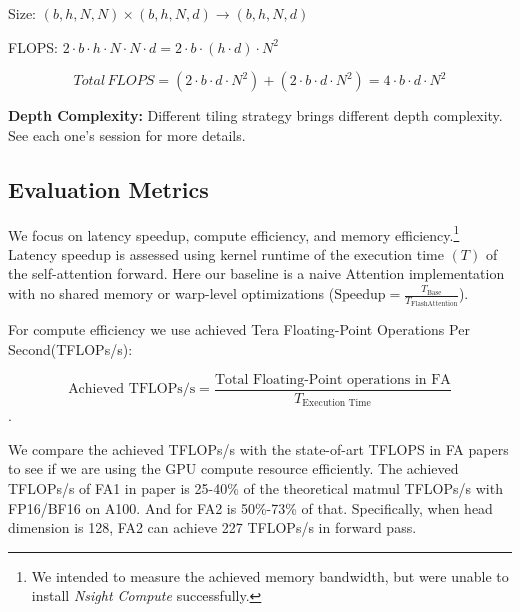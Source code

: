 \documentclass[11pt]{article}
\renewcommand\cite{\citep}  %
\begin{document}
Size: $(b, h, N, N) \times (b, h, N, d) \rightarrow (b, h, N, d)$

FLOPS: $2 \cdot b \cdot h \cdot N \cdot N \cdot d = 2 \cdot b \cdot (h \cdot d) \cdot N^2$

$$ Total\, FLOPS = (2 \cdot b \cdot d \cdot N^2) + (2 \cdot b \cdot d \cdot N^2) = 4 \cdot b \cdot d \cdot N^2 $$


\textbf{Depth Complexity: } Different tiling strategy brings different depth complexity. See each one's session for more details.


\subsection{Evaluation Metrics}
We focus on latency speedup, compute efficiency, and memory efficiency.\footnote{We intended to measure the achieved memory bandwidth, but were unable to install \textit{Nsight Compute} successfully.} Latency speedup is assessed using kernel runtime of the execution time $(T)$ of the self-attention forward. Here our baseline is a naive Attention implementation with no shared memory or warp-level optimizations ($\text{Speedup} = \frac{T_{\text{Base}}}{T_{\text{FlashAttention}}}$).

For compute efficiency we use achieved Tera Floating-Point Operations Per Second(TFLOPs/s): 

$$\text{Achieved TFLOPs/s} = \frac{\text{Total Floating-Point operations in FA}}{T_{\text{Execution Time}}}$$.

We compare the achieved TFLOPs/s with the state-of-art TFLOPS in FA papers to see if we are using the GPU compute resource efficiently. The achieved TFLOPs/s of FA1 in paper is 25-40\% of the theoretical matmul TFLOPs/s with FP16/BF16 on A100. And for FA2 is 50\%-73\% of that\cite{dao2023flashattention}. Specifically, when head dimension is 128, FA2 can achieve 227 TFLOPs/s in forward pass.




 \begin{comment}
\begin{algorithm}[htbp]
  \caption{Standard Attention}
  \label{alg:standard_attention}
  \begin{algorithmic}[1]
    \STATE Load $Q$ and $K$ by blocks from HBM.
    \STATE Compute $S = (1/\sqrt{d})QK^T$ (GEMM-I).
    \STATE Write $S$ to HBM.
    \STATE Read $S$ from HBM.
    \STATE Compute $S = S - \text{rowmax}(S)$.
    \STATE Compute $P = \text{softmax}(S)$.
    \STATE Write $P$ to HBM.
    \STATE Load $P$ and $V$ by blocks from HBM.
    \STATE Compute $O = PV$ (GEMM-II).
    \STATE Write $O$ to HBM.
  \end{algorithmic}
\end{algorithm}
\end{comment}
\end{document}
